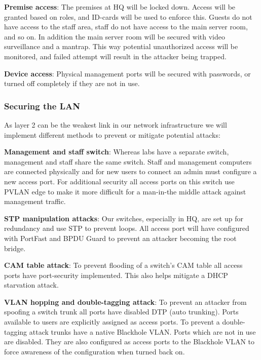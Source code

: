 

\textbf{Premise access}: The premises at HQ will be locked down. Access will be granted based on roles, and ID-cards will be used to enforce this. Guests do not have access to the staff area, staff do not have access to the main server room, and so on. In addition the main server room will be secured with video surveillance and a mantrap. This way potential unauthorized access will be monitored, and failed attempt will result in the attacker being trapped.

\textbf{Device access}: Physical management ports will be secured with passwords, or turned off completely if they are not in use.

\subsubsection{Securing the LAN}
As layer 2 can be the weakest link in our network infrastructure we will implement different methods to prevent or mitigate potential attacks:

\textbf{Management and staff switch}: Whereas labs have a separate switch, management and staff share the same switch. Staff and management computers are connected physically and for new users to connect an admin must configure a new access port. For additional security all access ports on this switch use PVLAN edge to make it more difficult for a man-in-the middle attack against management traffic.

\textbf{STP manipulation attacks}: Our switches, especially in HQ, are set up for redundancy and use STP to prevent loops. All access port will have configured with PortFast and BPDU Guard to prevent an attacker becoming the root bridge.

\textbf{CAM table attack}: To prevent flooding of a switch's CAM table all access ports have port-security implemented. This also helps mitigate a DHCP starvation attack.

\textbf{VLAN hopping and double-tagging attack}: To prevent an attacker from spoofing a switch trunk all ports have disabled DTP (auto trunking). Ports available to users are explicitly assigned as access ports. To prevent a double-tagging attack trunks have a native Blackhole VLAN. Ports which are not in use are disabled. They are also configured as access ports to the Blackhole VLAN to force awareness of the configuration when turned back on.

